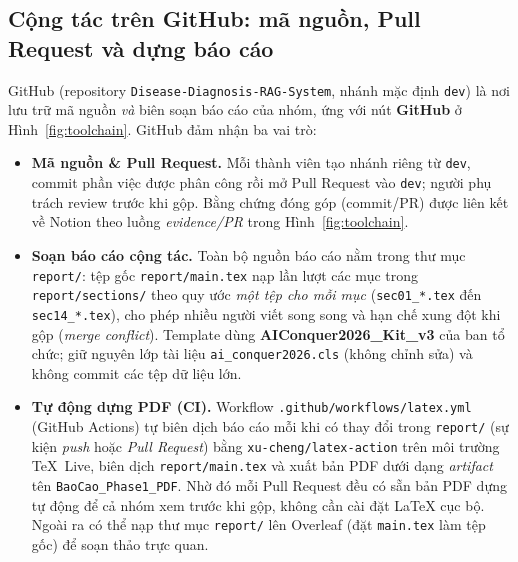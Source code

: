 \subsection{Cộng tác trên GitHub: mã nguồn, Pull Request và dựng báo cáo}
GitHub (repository \texttt{Disease-Diagnosis-RAG-System}, nhánh mặc định \texttt{dev}) là nơi lưu trữ mã nguồn \emph{và} biên soạn báo cáo của nhóm, ứng với nút \textbf{GitHub} ở Hình~\ref{fig:toolchain}. GitHub đảm nhận ba vai trò:
\begin{itemize}
    \item \textbf{Mã nguồn \& Pull Request.} Mỗi thành viên tạo nhánh riêng từ \texttt{dev}, commit phần việc được phân công rồi mở Pull Request vào \texttt{dev}; người phụ trách review trước khi gộp. Bằng chứng đóng góp (commit/PR) được liên kết về Notion theo luồng \emph{evidence/PR} trong Hình~\ref{fig:toolchain}.
    \item \textbf{Soạn báo cáo cộng tác.} Toàn bộ nguồn báo cáo nằm trong thư mục \texttt{report/}: tệp gốc \texttt{report/main.tex} nạp lần lượt các mục trong \texttt{report/sections/} theo quy ước \emph{một tệp cho mỗi mục} (\texttt{sec01\_*.tex} đến \texttt{sec14\_*.tex}), cho phép nhiều người viết song song và hạn chế xung đột khi gộp (\textit{merge conflict}). Template dùng \textbf{AIConquer2026\_Kit\_v3} của ban tổ chức; giữ nguyên lớp tài liệu \texttt{ai\_conquer2026.cls} (không chỉnh sửa) và không commit các tệp dữ liệu lớn.
    \item \textbf{Tự động dựng PDF (CI).} Workflow \texttt{.github/workflows/latex.yml} (GitHub Actions) tự biên dịch báo cáo mỗi khi có thay đổi trong \texttt{report/} (sự kiện \textit{push} hoặc \textit{Pull Request}) bằng \texttt{xu-cheng/latex-action} trên môi trường TeX~Live, biên dịch \texttt{report/main.tex} và xuất bản PDF dưới dạng \emph{artifact} tên \texttt{BaoCao\_Phase1\_PDF}. Nhờ đó mỗi Pull Request đều có sẵn bản PDF dựng tự động để cả nhóm xem trước khi gộp, không cần cài đặt LaTeX cục bộ. Ngoài ra có thể nạp thư mục \texttt{report/} lên Overleaf (đặt \texttt{main.tex} làm tệp gốc) để soạn thảo trực quan.
\end{itemize}

